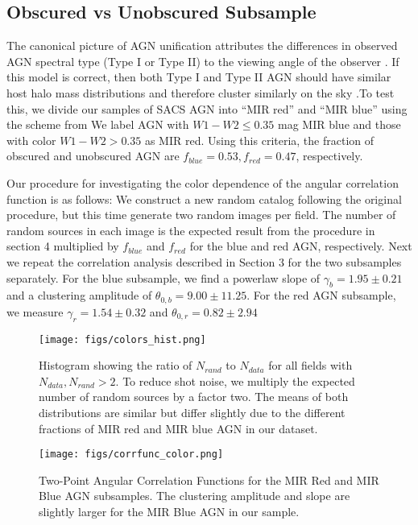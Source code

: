 \documentclass[preprint]{aastex63}
\begin{document}
\subsection{Obscured vs Unobscured Subsample}
The canonical picture of AGN unification attributes the differences in observed AGN spectral type (Type I or Type II)
to the viewing angle of the observer \citep{antonucci:1985}. If this model is correct, then both Type I and Type II AGN should 
have similar host halo mass distributions and therefore cluster similarly on the sky \citep{mitra:2018}.To test this, we divide our 
samples of SACS AGN into ``MIR red'' and ``MIR blue'' using the scheme from \cite{dai_2015}
We label AGN with $W1 - W2 \leq 0.35$ mag MIR blue and those with color $W1 - W2 > 0.35$  as MIR red. Using this criteria, the fraction of obscured 
and unobscured AGN are $f_{blue} = 0.53 , f_{red} = 0.47 $, respectively.

Our procedure for investigating the color dependence of the angular correlation function is as follows:
We construct a new random catalog following the original procedure, but this time generate two random images per field. The number of random sources in each image
is the expected result from the procedure in section 4 multiplied by $f_{blue}$ and $f_{red}$ for the blue and red AGN, respectively. Next we repeat the correlation analysis
described in Section 3 for the two subsamples separately. For the blue subsample, we find a powerlaw slope of $\gamma_b = 1.95 \pm 0.21$ and a clustering amplitude of $\theta_{0,b} = 9.00 \pm 11.25 $. For the 
red AGN subsample, we measure $\gamma_r = 1.54 \pm 0.32 $ and $\theta_{0,r} = 0.82 \pm 2.94$ 

\begin{figure}[!h]
    \centering
    \texttt{[image: figs/colors\_hist.png]}
    \label{fig:hist_color}
    \caption{Histogram showing the ratio of $N_{rand}$ to $N_{data}$ for all fields with $N_{data},N_{rand}> 2$. To reduce shot noise, we multiply
    the expected number of random sources by a factor  two. The means of both distributions are similar but differ slightly due to the different fractions
    of MIR red and MIR blue AGN in our dataset.  }
\end{figure}


\begin{figure}[!h]
    \centering
    \texttt{[image: figs/corrfunc\_color.png]}
    \label{fig:corr_color}
    \caption{Two-Point Angular Correlation Functions for the MIR Red and MIR Blue AGN subsamples. The clustering amplitude and slope are
    slightly larger for the MIR Blue AGN in our sample. }
\end{figure}
\end{document}

